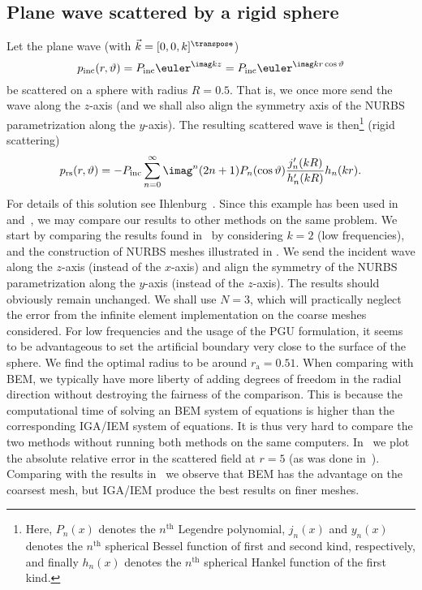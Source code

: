 \subsection{Plane wave scattered by a rigid sphere}
Let the plane wave (with $\vec{k}=[0, 0, k]^\transpose$)
\begin{equation*}
	p_{\textrm{inc}}(r,\vartheta) = P_{\mathrm{inc}}\euler^{\imag kz} = P_{\mathrm{inc}}\euler^{\imag kr\cos\vartheta}
\end{equation*}
be scattered on a sphere with radius $R=0.5$. That is, we once more send the wave along the $z$-axis (and we shall also align the symmetry axis of the NURBS parametrization along the $y$-axis). The resulting scattered wave is then\footnote{Here, $P_n(x)$ denotes the $n^{\mathrm{th}}$ Legendre polynomial, $j_n(x)$ and $y_n(x)$ denotes the $n^{\mathrm{th}}$ spherical Bessel function of first and second kind, respectively, and finally $h_n(x)$ denotes the $n^{\mathrm{th}}$ spherical Hankel function of the first kind.} (rigid scattering)
\begin{equation}\label{Eq2:rigidScattering_p}
	p_{\mathrm{rs}} (r,\vartheta) = -P_{\mathrm{inc}}\sum_{n=0}^\infty \imag^n (2n+1) P_n(\cos\vartheta)\frac{j_n'(kR)}{h_n'(kR)} h_n(kr).
\end{equation}
For details of this solution see Ihlenburg~\cite[p. 28]{Ihlenburg1998fea}. Since this example has been used in~\cite{Gerdes1999otp} and~\cite{Simpson2014aib}, we may compare our results to other methods on the same problem. We start by comparing the results found in~\cite{Simpson2014aib} by considering $k=2$ (low frequencies), and the construction of NURBS meshes illustrated in . We send the incident wave along the $z$-axis (instead of the $x$-axis) and align the symmetry of the NURBS parametrization along the $y$-axis (instead of the $z$-axis). The results should obviously remain unchanged. We shall use $N=3$, which will practically neglect the error from the infinite element implementation on the coarse meshes considered. For low frequencies and the usage of the PGU formulation, it seems to be advantageous to set the artificial boundary very close to the surface of the sphere. We find the optimal radius to be around $r_{\mathrm{a}}=0.51$. When comparing with BEM, we typically have more liberty of adding degrees of freedom in the radial direction without destroying the fairness of the comparison. This is because the computational time of solving an BEM system of equations is higher than the corresponding IGA/IEM system of equations. It is thus very hard to compare the two methods without running both methods on the same computers. In~ we plot the absolute relative error in the scattered field at $r=5$ (as was done in~\cite{Simpson2014aib}). Comparing with the results in~\cite{Simpson2014aib} we observe that BEM has the advantage on the coarsest mesh, but IGA/IEM produce the best results on finer meshes. 
